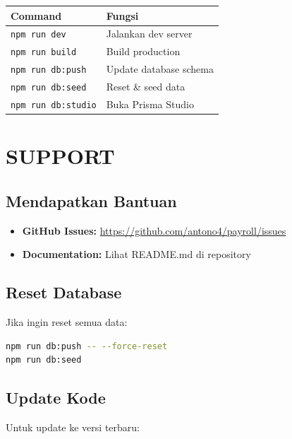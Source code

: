 \documentclass[12pt,a4paper]{article}
\begin{document}
\begin{center}
\begin{tabular}{|l|l|}
    \hline
    \textbf{Command} & \textbf{Fungsi} \\
    \hline
    \texttt{npm run dev} & Jalankan dev server \\
    \hline
    \texttt{npm run build} & Build production \\
    \hline
    \texttt{npm run db:push} & Update database schema \\
    \hline
    \texttt{npm run db:seed} & Reset \& seed data \\
    \hline
    \texttt{npm run db:studio} & Buka Prisma Studio \\
    \hline
\end{tabular}
\end{center}

\newpage
\section{SUPPORT}

\subsection{Mendapatkan Bantuan}

\begin{itemize}
    \item \textbf{GitHub Issues:} \url{https://github.com/antono4/payroll/issues}
    \item \textbf{Documentation:} Lihat README.md di repository
\end{itemize}

\subsection{Reset Database}

Jika ingin reset semua data:

\begin{lstlisting}[language=bash]
npm run db:push -- --force-reset
npm run db:seed
\end{lstlisting}

\subsection{Update Kode}

Untuk update ke versi terbaru:
\end{document}
